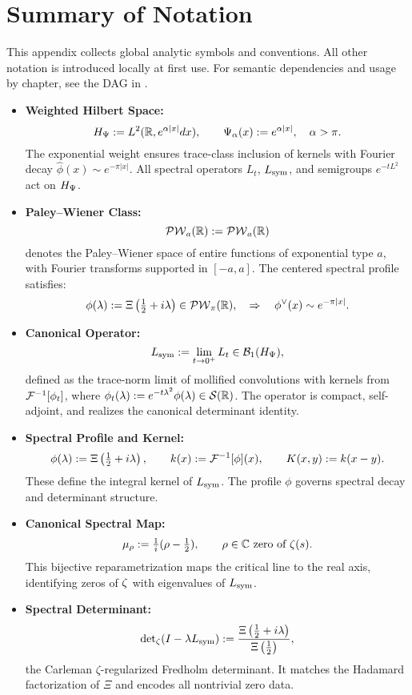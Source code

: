 \section{Summary of Notation}
\label{app:notation_summary}

\noindent
This appendix collects global analytic symbols and conventions. All other notation is introduced locally at first use. For semantic dependencies and usage by chapter, see the DAG in .

\begin{itemize}
  \item \textbf{Weighted Hilbert Space:}
  \[
  H_{\Psi} := L^2(\mathbb{R}, e^{\alpha |x|} dx), \qquad \Psi_\alpha(x) := e^{\alpha |x|}, \quad \alpha > \pi.
  \]
  The exponential weight ensures trace-class inclusion of kernels with Fourier decay \( \widehat{\phi}(x) \sim e^{-\pi |x|} \). All spectral operators \( L_t \), \( L_{\mathrm{sym}} \), and semigroups \( e^{-tL^2} \) act on \( H_{\Psi} \).

  \item \textbf{Paley–Wiener Class:}
  \[
  \mathcal{PW}_{a}(\mathbb{R}) := \mathcal{PW}_a(\mathbb{R})
  \]
  denotes the Paley–Wiener space of entire functions of exponential type \( a \), with Fourier transforms supported in \( [-a, a] \). The centered spectral profile satisfies:
  \[
  \phi(\lambda) := \Xi\left( \tfrac{1}{2} + i\lambda \right) \in \mathcal{PW}_{\pi}(\mathbb{R}), \quad \Rightarrow \quad \phi^\vee(x) \sim e^{-\pi |x|}.
  \]

  \item \textbf{Canonical Operator:}
  \[
  L_{\mathrm{sym}} := \lim_{t \to 0^+} L_t \in \mathcal{B}_1(H_{\Psi}),
  \]
  defined as the trace-norm limit of mollified convolutions with kernels from \( \mathcal{F}^{-1}[\phi_t] \), where \( \phi_t(\lambda) := e^{-t\lambda^2} \phi(\lambda) \in \mathcal{S}(\mathbb{R}) \). The operator is compact, self-adjoint, and realizes the canonical determinant identity.

  \item \textbf{Spectral Profile and Kernel:}
  \[
  \phi(\lambda) := \Xi\left( \tfrac{1}{2} + i\lambda \right), \qquad k(x) := \mathcal{F}^{-1}[\phi](x), \qquad K(x, y) := k(x - y).
  \]
  These define the integral kernel of \( L_{\mathrm{sym}} \). The profile \( \phi \) governs spectral decay and determinant structure.

  \item \textbf{Canonical Spectral Map:}
  \[
  \mu_\rho := \tfrac{1}{i}(\rho - \tfrac{1}{2}), \qquad \rho \in \mathbb{C} \text{ zero of } \zeta(s).
  \]
  This bijective reparametrization maps the critical line to the real axis, identifying zeros of \( \zeta \) with eigenvalues of \( L_{\mathrm{sym}} \).

  \item \textbf{Spectral Determinant:}
  \[
  \det\nolimits_{\zeta}(I - \lambda L_{\mathrm{sym}}) := \frac{\Xi\left( \tfrac{1}{2} + i\lambda \right)}{\Xi\left( \tfrac{1}{2} \right)},
  \]
  the Carleman \(\zeta\)-regularized Fredholm determinant. It matches the Hadamard factorization of \( \Xi \) and encodes all nontrivial zero data.
\end{itemize}

